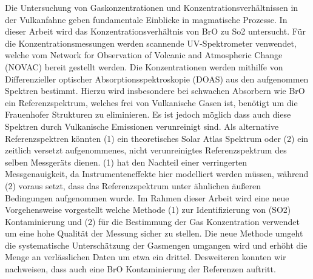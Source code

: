 Die Untersuchung von Gaskonzentrationen und Konzentrationsverhältnissen in der Vulkanfahne geben fundamentale Einblicke in magmatische Prozesse.
In dieser Arbeit wird das Konzentrationsverhältnis von BrO zu So2 untersucht.
Für die Konzentrationsmessungen werden scannende UV-Spektrometer venwendet, welche vom Network for Observation of Volcanic and Atmospheric Change (NOVAC) bereit gestellt werden.
Die Konzentrationen werden mithilfe von Differenzieller optischer Absorptionsspektroskopie (DOAS) aus den aufgenommen Spektren bestimmt. Hierzu wird insbesondere bei schwachen Absorbern wie BrO ein Referenzspektrum, welches frei von Vulkanische Gasen ist, benötigt um die Frauenhofer Strukturen zu eliminieren.
Es ist jedoch möglich dass auch diese Spektren durch Vulkanische Emissionen verunreinigt sind. Als alternative Referenzspektren könnten (1) ein theoretisches Solar Atlas Spektrum oder (2) ein zeitlich versetzt aufgenommenes, nicht verunreinigtes Referenzspektrum des selben Messgeräts dienen.
(1) hat den Nachteil einer verringerten Messgenauigkeit, da Instrumenteneffekte hier modelliert werden müssen, während (2) voraus setzt, dass das Referenzspektrum unter ähnlichen äußeren Bedingungen aufgenommen wurde.
Im Rahmen dieser Arbeit wird eine neue Vorgehensweise vorgestellt welche Methode (1) zur Identifizierung von (SO2) Kontaminierung und (2) für die Bestimmung der Gas Konzentration verwendet um eine hohe Qualität der Messung sicher zu stellen.
Die neue Methode umgeht die systematische Unterschätzung der Gasmengen umgangen wird und erhöht die Menge an verlässlichen Daten um etwa ein drittel. Desweiteren konnten wir nachweisen, dass auch eine BrO Kontaminierung der Referenzen auftritt. 